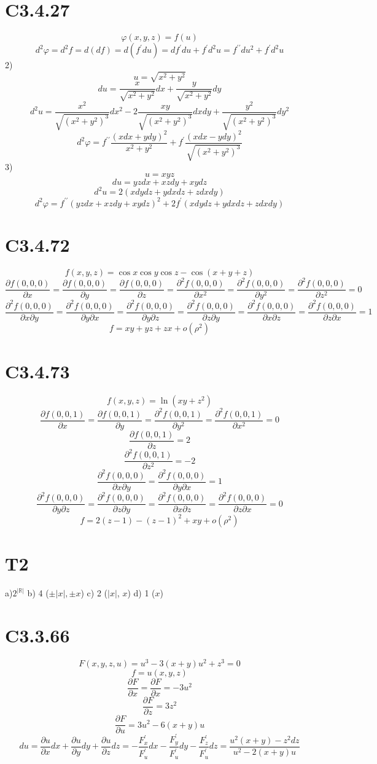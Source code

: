 \documentclass[a4paper,12pt]{article} %
\begin{document}
\section*{C3.4.27}$$\varphi(x,y,z)=f(u)$$
$$d^2\varphi=d^2f=d(df)=d(f^{\prime}du)=df^{\prime}du+f^{\prime}d^2u=f^{\prime\prime}du^2+f^{\prime}d^2u$$
2)$$u=\sqrt{x^2+y^2}$$
$$du=\frac{x}{\sqrt{x^2+y^2}}dx+\frac{y}{\sqrt{x^2+y^2}}dy$$
$$d^2u=\frac{x^2}{\sqrt{(x^2+y^2)^3}}dx^2-2\frac{xy}{\sqrt{(x^2+y^2)^3}}dxdy+\frac{y^2}{\sqrt{(x^2+y^2)^3}}dy^2$$
$$d^2\varphi=f^{\prime\prime}\frac{(xdx+ydy)^2}{x^2+y^2}+f^{\prime}\frac{(xdx-ydy)^2}{\sqrt{(x^2+y^2)^3}}$$
3)$$u=xyz$$
$$du=yzdx+xzdy+xydz$$
$$d^2u=2(xdydz+ydxdz+zdxdy)$$
$$d^2\varphi=f^{\prime\prime}(yzdx+xzdy+xydz)^2+2f^{\prime}(xdydz+ydxdz+zdxdy)$$
\section*{C3.4.72}
$$f(x,y,z)=\cos x\cos y\cos z-\cos (x+y+z)$$
$$\frac{\partial f(0,0,0)}{\partial x}=\frac{\partial f(0,0,0)}{\partial y}=\frac{\partial f(0,0,0)}{\partial z}=\frac{\partial^2 f(0,0,0)}{\partial x^2}=\frac{\partial^2 f(0,0,0)}{\partial y^2}=\frac{\partial^2 f(0,0,0)}{\partial z^2}=0$$
$$\frac{\partial^2 f(0,0,0)}{\partial x\partial y}=\frac{\partial^2 f(0,0,0)}{\partial y\partial x}=\frac{\partial^2 f(0,0,0)}{\partial y\partial z}=\frac{\partial^2 f(0,0,0)}{\partial z\partial y}=\frac{\partial^2 f(0,0,0)}{\partial x\partial z}=\frac{\partial^2 f(0,0,0)}{\partial z\partial x}=1$$
$$f=xy+yz+zx+o(\rho^2)$$
\section*{C3.4.73}
$$f(x,y,z)=\ln(xy+z^2)$$
$$\frac{\partial f(0,0,1)}{\partial x}=\frac{\partial f(0,0,1)}{\partial y}=\frac{\partial^2 f(0,0,1)}{\partial y^2}=\frac{\partial^2 f(0,0,1)}{\partial x^2}=0$$
$$\frac{\partial f(0,0,1)}{\partial z}=2$$
$$\frac{\partial^2 f(0,0,1)}{\partial z^2}=-2$$
$$\frac{\partial^2 f(0,0,0)}{\partial x\partial y}=\frac{\partial^2 f(0,0,0)}{\partial y\partial x}=1$$
$$\frac{\partial^2 f(0,0,0)}{\partial y\partial z}=\frac{\partial^2 f(0,0,0)}{\partial z\partial y}=\frac{\partial^2 f(0,0,0)}{\partial x\partial z}=\frac{\partial^2 f(0,0,0)}{\partial z\partial x}=0$$
$$f=2(z-1)-(z-1)^2+xy+o(\rho^2)$$
\section*{T2}a)$2^{|\mathbb{R}|}$
b) 4 ($\pm|x|,\pm x$)
c) 2 ($|x|$, $x$)
d) 1 ($x$)
\section*{C3.3.66}$$F(x,y,z,u)=u^3-3(x+y)u^2+z^3=0$$
$$f=u(x,y,z)$$
$$\frac{\partial F}{\partial x}=\frac{\partial F}{\partial x}=-3u^2$$
$$\frac{\partial F}{\partial z}=3z^2$$
$$\frac{\partial F}{\partial u}=3u^2-6(x+y)u$$
$$du=\frac{\partial u}{\partial x}dx+\frac{\partial u}{\partial y}dy+\frac{\partial u}{\partial z}dz=-\frac{F^{\prime}_{x}}{F^{\prime}_{u}}dx-\frac{F^{\prime}_{y}}{F^{\prime}_{u}}dy-\frac{F^{\prime}_{z}}{F^{\prime}_{u}}dz=\frac{u^2(x+y)-z^2dz}{u^2-2(x+y)u}$$
\end{document}
